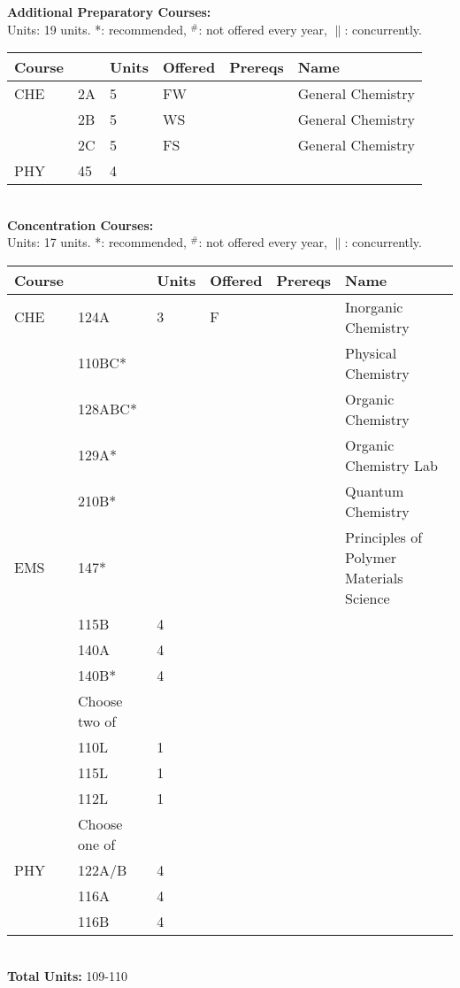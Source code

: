 \documentclass[12pt]{article}
\begin{document}
\newpage
{}
\vskip 0.25cm
\noindent
{\bf Additional Preparatory Courses:  }\\
Units:  19 units. *: recommended, $^\#$: not offered every year, $\parallel$: concurrently.\\
\begin{tabular}{|llllll|}
\hline
Course & & Units & Offered & Prereqs & Name \\
\hline
CHE  & 2A      & 5 & FW  & & General Chemistry \\
     & 2B      & 5 & WS  & & General Chemistry \\
     & 2C      & 5 & FS  & & General Chemistry \\
PHY  & 45     & 4 & & & \\
\hline
\end{tabular}\\
\vskip 0.25cm
\noindent
{\bf Concentration Courses:  }\\
Units:  17 units. *: recommended, $^\#$: not offered every year, $\parallel$: concurrently.\\
\begin{tabular}{|llllll|}
\hline
Course & & Units & Offered & Prereqs & Name \\
\hline
CHE  & 124A    & 3 & F   & & Inorganic Chemistry\\
     & 110BC*  &  & & & Physical Chemistry\\
     & 128ABC* &  & & & Organic Chemistry\\
     & 129A*   &  & & & Organic Chemistry Lab\\
     & 210B*   &  & & & Quantum Chemistry\\
EMS  & 147*    &  & & & Principles of Polymer Materials Science\\
     & 115B   & 4 & & & \\
     & 140A   & 4 & & & \\
     & 140B*  & 4 & & & \\
\hline
    & Choose two of & & & & \\
\hline
    & 110L & 1 & & & \\
    & 115L & 1 & & & \\
    & 112L & 1 & & & \\
\hline
\hline
    & Choose one of & & & & \\
\hline
PHY & 122A/B & 4 & & & \\
    & 116A   & 4 & & & \\
    & 116B   & 4 & & & \\
\hline
\end{tabular}\\
\vskip 0.25cm
\noindent
{\bf Total Units:} 109-110 \\
\end{document}

